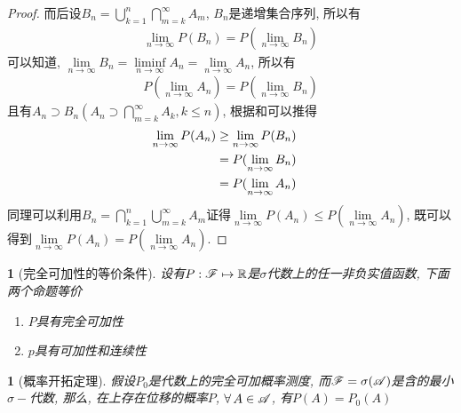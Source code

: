 \begin{enumerate}
\begin{proof}
        而后设\(B_n = \bigcup\limits_{k=1}^n\bigcap\limits_{m=k}^\infty A_m\), \(B_n\)是递增集合序列, 所以有
        \begin{align}\label{equ:seqcon1}\lim\limits_{n\to\infty}P(B_n) = P(\lim\limits_{n\to\infty}B_n)\end{align}
        可以知道, \(\lim\limits_{n\to\infty}B_n = \liminf\limits_{n\to\infty}A_n = \lim\limits_{n\to\infty}A_n\),
        所以有\begin{align}\label{equ:seqcon2}P(\lim\limits_{n\to\infty}A_n) = P(\lim\limits_{n\to\infty}B_n)\end{align}
        且有\(A_n \supset B_n(A_n\supset\bigcap\limits_{m=k}^\infty A_k, k\le n)\), 根据和可以推得
        \begin{align}\label{equ:seqcon3}
            \lim\limits_{n\to\infty}P(A_n)&\ge \lim\limits_{n\to\infty}P(B_n)\cr
            &= P(\lim\limits_{n\to\infty}B_n)\cr &= P(\lim\limits_{n\to\infty}A_n)
        \end{align}
        同理可以利用\(B_n = \bigcap\limits_{k=1}^n\bigcup\limits_{m=k}^\infty A_m\)证得\(\lim\limits_{n\to\infty}P(A_n)\le P(\lim\limits_{n\to\infty}A_n)\),
        既可以得到\(\lim\limits_{n\to\infty}P(A_n) = P(\lim\limits_{n\to\infty}A_n)\).
    \end{proof}
\end{enumerate}

\newtheorem{continuous_eqaulity__}[theorem_root]{\theorem}
\begin{continuous_eqaulity__}[完全可加性的等价条件]
设有\(P:\msF\mapsto\Rs\)是\(\sigma\)代数\msF 上的任一非负实值函数, 下面两个命题等价
\begin{enumerate}
\item \(P\)具有完全可加性
\item \(p\)具有可加性和连续性
\end{enumerate}
\end{continuous_eqaulity__}

\newtheorem{probability_exploring_theorem}[theorem_root]{\theorem}
\begin{probability_exploring_theorem}[概率开拓定理]
    假设\(P_0\)是代数\msA 上的完全可加概率测度, 而\(\msF = \sigma(\msA)\)是含\msA 的最小\(\sigma-\)代数, 
    那么, 在\msF 上存在位移的概率\(P\), \(\forall\,A\in\msA\), 有\(P(A) = P_0(A)\)
\end{probability_exploring_theorem}

